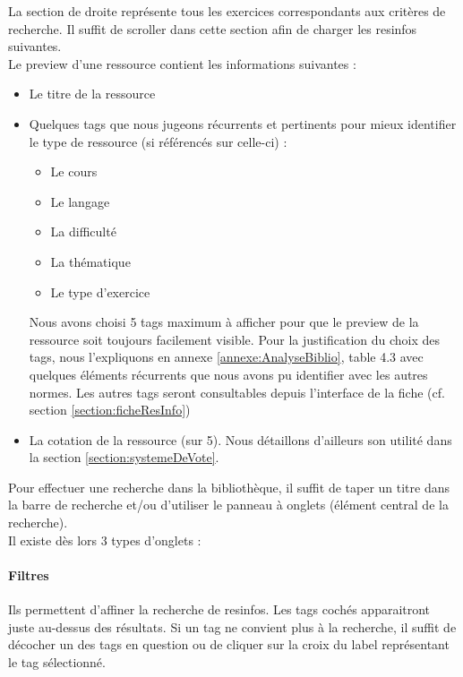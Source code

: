 
La section de droite représente tous les exercices correspondants aux critères de recherche. Il suffit de scroller dans cette section afin de charger les \glspl{resinfo} suivantes.\\

Le preview d'une ressource contient les informations suivantes :

\begin{itemize}
    \item Le titre de la ressource
    \item Quelques \glspl{tag} que nous jugeons récurrents et pertinents pour mieux identifier le type de ressource (si référencés sur celle-ci) : 
    \begin{itemize}
        \item Le cours
        \item Le langage
        \item La difficulté
        \item La thématique
        \item Le type d'exercice
    \end{itemize}
    Nous avons choisi 5 \glspl{tag} maximum à afficher pour que le preview de la ressource soit toujours facilement visible. Pour la justification du choix des \glspl{tag}, nous l'expliquons en annexe \ref{annexe:AnalyseBiblio}, table 4.3 avec quelques éléments récurrents que nous avons pu identifier avec les autres normes.
    Les autres \glspl{tag} seront consultables depuis l'interface de la \gls{fiche} (cf. section \ref{section:ficheResInfo})
    \item La cotation de la ressource (sur 5). Nous détaillons d'ailleurs son utilité dans la section \ref{section:systemeDeVote}.
\end{itemize}

\label{section:panneau}

Pour effectuer une recherche dans la bibliothèque, il suffit de taper un titre dans la barre de recherche et/ou d'utiliser le panneau à onglets (élément central de la recherche).\\

Il existe dès lors 3 types d'onglets :

\paragraph{Filtres} Ils permettent d'affiner la recherche de \glspl{resinfo}. Les \glspl{tag} cochés apparaitront juste au-dessus des résultats. Si un \gls{tag} ne convient plus à la recherche, il suffit de décocher un des tags en question ou de cliquer sur la croix du label représentant le \gls{tag} sélectionné.\\

